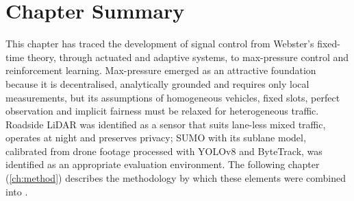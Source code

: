 \section{Chapter Summary}\label{sec:lit-summary}
This chapter has traced the development of signal control from Webster's fixed-time theory, through actuated and
adaptive systems, to max-pressure control and reinforcement learning. Max-pressure emerged as an attractive
foundation because it is decentralised, analytically grounded and requires only local measurements, but its
assumptions of homogeneous vehicles, fixed slots, perfect observation and implicit fairness must be relaxed for
heterogeneous traffic. Roadside LiDAR was identified as a sensor that suits lane-less mixed traffic, operates at
night and preserves privacy; SUMO with its sublane model, calibrated from drone footage processed with YOLOv8 and
ByteTrack, was identified as an appropriate evaluation environment. The following chapter (\cref{ch:method})
describes the methodology by which these elements were combined into \prism{}.
